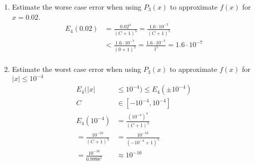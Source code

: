 \documentclass{article}
\begin{document}
\begin{enumerate}[label=(\alph*)]
    \item Estimate the worse case error when using \(P_3(x)\) to approximate \(f(x)\) for \(x = 0.02\).
          \begin{align*}
              E_{4}(0.02) & = \frac{0.02^4}{(C + 1)^5} = \frac{1.6 \cdot 10^{-7}}{(C + 1) ^ 5}                            \\
                          & < \frac{1.6 \cdot 10^{-7}}{(0 + 1) ^ 5} = \frac{1.6 \cdot 10^{-7}}{1 ^ 5} = 1.6 \cdot 10^{-7} \\
          \end{align*}
    \item Estimate the worst case error when using \(P_3(x)\) to approximate \(f(x)\) for \(\vert x \vert \leq 10^{-4}\)
          \begin{align*}
              E_4(\vert x \vert             & \leq 10^{-4}) \leq E_4(\pm 10^{-4}) \\
              C                             & \in [-10^{-4}, 10^{-4}]             \\
              E_4(10^{-4})                  & = \frac{(10^{-4})^4}{(C + 1)^5}     \\
              = \frac{10^{-16}}{(C + 1)^5}  & = \frac{10^{-16}}{(-10^{-4} + 1)^5} \\
              = \frac{10^{-16}}{0.9998 ^ 5} & \approx 10^{-16}                    \\
          \end{align*}
\end{enumerate}
\end{document}
